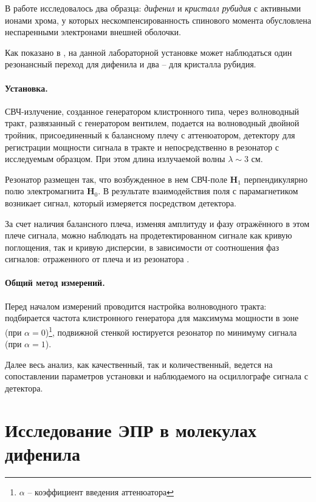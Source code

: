 \documentclass[a4paper,14pt]{extarticle}
\renewcommand{\vec}{\mathbf} %
\begin{document}
В работе исследовалось два образца: \textit{дифенил} и \textit{кристалл рубидия} с активными ионами хрома, у которых нескомпенсированность спинового момента обусловлена неспаренными электронами внешней оболочки. 

Как показано в \cite[стр. 20, 24]{mar}, на данной лабораторной установке может наблюдаться один резонансный переход для дифенила и два -- для кристалла рубидия.


\paragraph{Установка.} СВЧ-излучение, созданное генератором клистронного типа, через волноводный тракт, развязанный с генератором вентилем, подается на волноводный двойной тройник, присоединенный к балансному плечу с аттенюатором, детектору для регистрации мощности сигнала в тракте и непосредственно в резонатор с исследуемым образцом. При этом длина излучаемой волны $\lambda \sim 3$ см.

Резонатор размещен так, что возбужденное в нем СВЧ-поле $\vec{H}_1$ перпендикулярно полю электромагнита $\vec{H}_0$. В результате взаимодействия поля с парамагнетиком возникает сигнал, который измеряется посредством детектора.

За счет наличия балансного плеча, изменяя амплитуду и фазу отражённого в этом плече сигнала, можно наблюдать на продетектированном сигнале как кривую поглощения, так и кривую дисперсии, в зависимости от соотношения фаз сигналов: отраженного от плеча и из резонатора \cite[стр. 33]{mar}.

\paragraph{Общий метод измерений.} Перед началом измерений проводится настройка волноводного тракта: подбирается частота клистронного генератора для максимума мощности в зоне (при $\alpha=0$)\footnote{$\alpha$ -- коэффициент введения аттенюатора}, подвижной стенкой юстируется резонатор по минимуму сигнала (при $\alpha=1$). 

Далее весь анализ, как качественный, так и количественный, ведется на сопоставлении параметров установки и наблюдаемого на осциллографе сигнала с детектора.

\newpage

\newpage
\section{Исследование ЭПР в молекулах дифенила}
\end{document}
